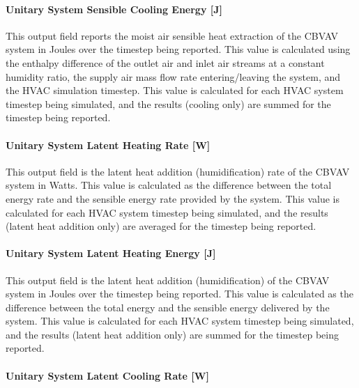\paragraph{Unitary System Sensible Cooling Energy {[}J{]}}\label{unitary-system-sensible-cooling-energy-j}

This output field reports the moist air sensible heat extraction of the CBVAV system in Joules over the timestep being reported. This value is calculated using the enthalpy difference of the outlet air and inlet air streams at a constant humidity ratio, the supply air mass flow rate entering/leaving the system, and the HVAC simulation timestep. This value is calculated for each HVAC system timestep being simulated, and the results (cooling only) are summed for the timestep being reported.

\paragraph{Unitary System Latent Heating Rate {[}W{]}}\label{unitary-system-latent-heating-rate-w-2}

This output field is the latent heat addition (humidification) rate of the CBVAV system in Watts. This value is calculated as the difference between the total energy rate and the sensible energy rate provided by the system. This value is calculated for each HVAC system timestep being simulated, and the results (latent heat addition only) are averaged for the timestep being reported.

\paragraph{Unitary System Latent Heating Energy {[}J{]}}\label{unitary-system-latent-heating-energy-j}

This output field is the latent heat addition (humidification) of the CBVAV system in Joules over the timestep being reported. This value is calculated as the difference between the total energy and the sensible energy delivered by the system. This value is calculated for each HVAC system timestep being simulated, and the results (latent heat addition only) are summed for the timestep being reported.

\paragraph{Unitary System Latent Cooling Rate {[}W{]}}\label{unitary-system-latent-cooling-rate-w-2}

